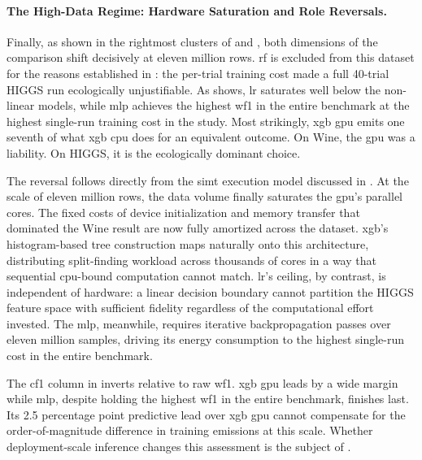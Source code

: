 \FloatBarrier
\paragraph{The High-Data Regime: Hardware Saturation and Role Reversals.}
\label{sec:results_higgs}

Finally, as shown in the rightmost clusters of  and , both dimensions of the comparison shift decisively at eleven million rows. \gls{rf} is excluded from this dataset for the reasons established in : the per-trial training cost made a full 40-trial HIGGS run ecologically unjustifiable. As  shows, \gls{lr} saturates well below the non-linear models, while \gls{mlp} achieves the highest \gls{wf1} in the entire benchmark at the highest single-run training cost in the study. Most strikingly, \gls{xgb} \gls{gpu} emits one seventh of what \gls{xgb} \gls{cpu} does for an equivalent outcome. On Wine, the \gls{gpu} was a liability. On HIGGS, it is the ecologically dominant choice.

The reversal follows directly from the \gls{simt} execution model discussed in . At the scale of eleven million rows, the data volume finally saturates the \gls{gpu}'s parallel cores. The fixed costs of device initialization and memory transfer that dominated the Wine result are now fully amortized across the dataset. \gls{xgb}'s histogram-based tree construction maps naturally onto this architecture, distributing split-finding workload across thousands of cores in a way that sequential \gls{cpu}-bound computation cannot match. \gls{lr}'s ceiling, by contrast, is independent of hardware: a linear decision boundary cannot partition the HIGGS feature space with sufficient fidelity regardless of the computational effort invested. The \gls{mlp}, meanwhile, requires iterative backpropagation passes over eleven million samples, driving its energy consumption to the highest single-run cost in the entire benchmark.

The \gls{cf1} column in  inverts relative to raw \gls{wf1}. \gls{xgb} \gls{gpu} leads by a wide margin while \gls{mlp}, despite holding the highest \gls{wf1} in the entire benchmark, finishes last. Its 2.5 percentage point predictive lead over \gls{xgb} \gls{gpu} cannot compensate for the order-of-magnitude difference in training emissions at this scale. Whether deployment-scale inference changes this assessment is the subject of .

